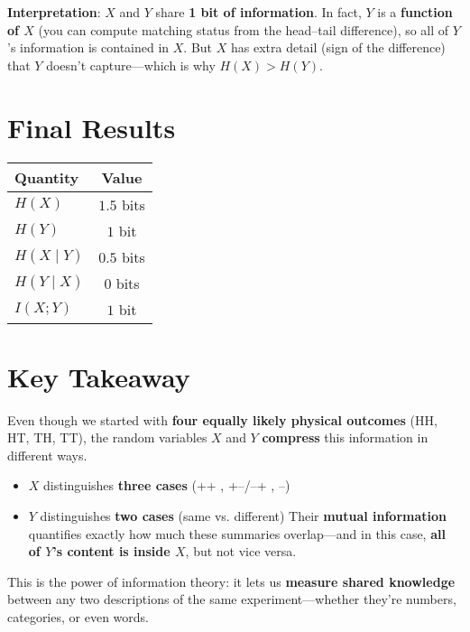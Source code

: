 \documentclass[11pt]{article}
\begin{document}
\textbf{Interpretation}: $X$ and $Y$ share \textbf{1 bit of information}.  
In fact, $Y$ is a \textbf{function of $X$} (you can compute matching status from the head--tail difference), so all of $Y$'s information is contained in $X$. But $X$ has extra detail (sign of the difference) that $Y$ doesn't capture—which is why $H(X) > H(Y)$.

\section*{{Final Results}}

\begin{center}
\begin{tabular}{lc}
\toprule
Quantity & Value \\
\midrule
$H(X)$ & $1.5$ bits \\
$H(Y)$ & $1$ bit \\
$H(X \mid Y)$ & $0.5$ bits \\
$H(Y \mid X)$ & $0$ bits \\
$I(X; Y)$ & $1$ bit \\
\bottomrule
\end{tabular}
\end{center}

\section*{{Key Takeaway}}

Even though we started with \textbf{four equally likely physical outcomes} (HH, HT, TH, TT), the random variables $X$ and $Y$ \textbf{compress} this information in different ways.
 \begin{itemize}
    \item $X$ distinguishes \textbf{three cases} (++ , +--/--+ , --)
    \item $Y$ distinguishes \textbf{two cases} (same vs. different)
Their \textbf{mutual information} quantifies exactly how much these summaries overlap—and in this case, \textbf{all of $Y$'s content is inside $X$}, but not vice versa.
\end{itemize}

This is the power of information theory: it lets us \textbf{measure shared knowledge} between any two descriptions of the same experiment—whether they’re numbers, categories, or even words.
\end{document}
